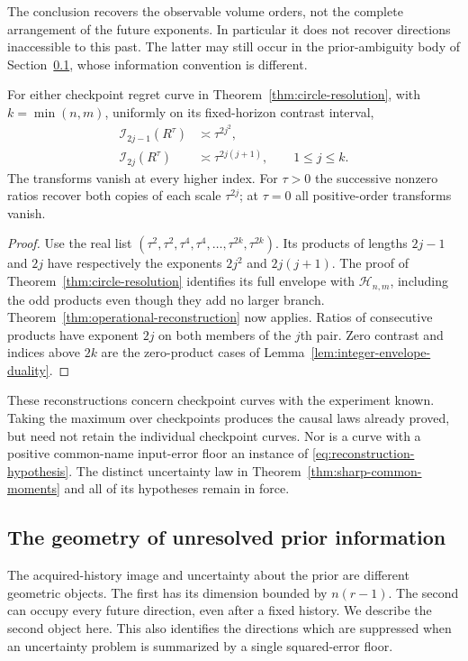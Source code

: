 The conclusion recovers the observable volume orders, not the complete
arrangement of the future exponents. In particular it does not recover
directions inaccessible to this past. The latter may still occur in the
prior-ambiguity body of Section~\ref{sec:directional-geometry}, whose
information convention is different.

\begin{corollary}
\label{cor:circular-operational-recovery}
For either checkpoint regret curve in
Theorem~\ref{thm:circle-resolution}, with $k=\min(n,m)$, uniformly on
its fixed-horizon contrast interval,
\begin{equation}\label{eq:circle-operational-recovery}
 \begin{split}
 \mathcal I_{2j-1}(R^\tau)&\asymp\tau^{2j^2},\\
 \mathcal I_{2j}(R^\tau)&\asymp\tau^{2j(j+1)},
             \qquad 1\le j\le k.
 \end{split}
\end{equation}
The transforms vanish at every higher index. For $\tau>0$ the
successive nonzero ratios recover both copies of each scale
$\tau^{2j}$; at $\tau=0$ all positive-order transforms vanish.
\end{corollary}
\begin{proof}
Use the real list
$(\tau^2,\tau^2,\tau^4,\tau^4,\ldots,\tau^{2k},\tau^{2k})$.
Its products of lengths $2j-1$ and $2j$ have respectively the exponents
$2j^2$ and $2j(j+1)$. The proof of
Theorem~\ref{thm:circle-resolution} identifies its full envelope with
$\mathcal H_{n,m}$, including the odd products even though they add no
larger branch. Theorem~\ref{thm:operational-reconstruction} now applies.
Ratios of consecutive products have exponent $2j$ on both members of
the $j$th pair. Zero contrast and indices above $2k$ are the zero-product
cases of Lemma~\ref{lem:integer-envelope-duality}.
\end{proof}

These reconstructions concern checkpoint curves with the experiment
known. Taking the maximum over checkpoints produces the causal laws
already proved, but need not retain the individual checkpoint curves.
Nor is a curve with a positive common-name input-error floor an instance
of \eqref{eq:reconstruction-hypothesis}. The distinct uncertainty law in
Theorem~\ref{thm:sharp-common-moments} and all of its hypotheses remain
in force.


\subsection{The geometry of unresolved prior information}
\label{sec:directional-geometry}
The acquired-history image and uncertainty about the prior are different
geometric objects. The first has its dimension bounded by $n(r-1)$.
The second can occupy every future direction, even after a fixed history.
We describe the second object here. This also identifies the directions
which are suppressed when an uncertainty problem is summarized by a
single squared-error floor.

